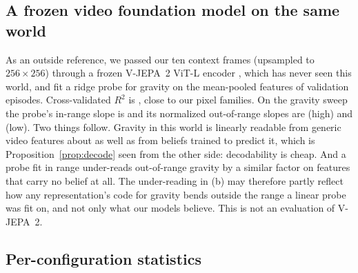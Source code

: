 \subsection{A frozen video foundation model on the same world}
As an outside reference, we passed our ten context frames (upsampled to $256{\times}256$) through
a frozen V-JEPA~2 ViT-L encoder \citep{assran2025vjepa2}, which has never seen this world, and fit a
ridge probe for gravity on the mean-pooled features of \VjN{} validation episodes. Cross-validated
$R^2$ is \VjRtwo, close to our pixel families. On the gravity sweep the probe's in-range slope is
\VjSlope{} and its normalized out-of-range slopes are \VjRhoHi{} (high) and \VjRhoLo{} (low). Two
things follow. Gravity in this world is linearly readable from generic video features about as well
as from beliefs trained to predict it, which is Proposition~\ref{prop:decode} seen from the other
side: decodability is cheap. And a probe fit in range under-reads out-of-range gravity by a similar
factor on features that carry no belief at all. The under-reading in (b) may
therefore partly reflect how any representation's code for gravity bends outside the range a linear
probe was fit on, and not only what our models believe. This is not an evaluation of V-JEPA~2.

\begin{table}[h]
\centering\small
\caption{Confirmatory tests (one-sided hierarchical bootstrap, Holm-corrected).}
\label{tab:hyp}

\end{table}

\subsection{Per-configuration statistics}

